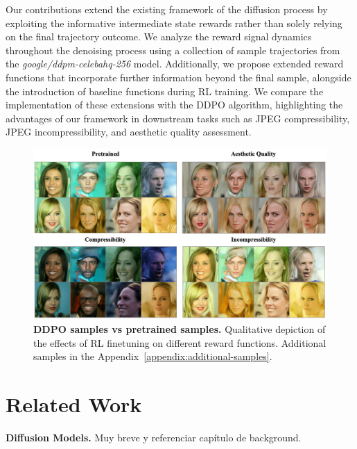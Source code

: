 Our contributions extend the existing framework of the diffusion process by exploiting the informative intermediate state rewards rather than solely relying on the final trajectory outcome. We analyze the reward signal dynamics throughout the denoising process using a collection of sample trajectories from the \textit{google/ddpm-celebahq-256} model. Additionally, we propose extended reward functions that incorporate further information beyond the final sample, alongside the introduction of baseline functions during RL training. We compare the implementation of these extensions with the DDPO algorithm, highlighting the advantages of our framework in downstream tasks such as JPEG compressibility, JPEG incompressibility, and aesthetic quality assessment.

\begin{figure}[ht]
  \centering
  \includegraphics[scale=0.72]{img/results/visual-comparison-results-200dpi.png}
  \vspace{-4pt}  %
    \captionsetup{width=\textwidth} %
    \caption{\textbf{DDPO samples vs pretrained samples.} Qualitative depiction of the effects of RL finetuning on different reward functions. Additional
    samples in the Appendix~\ref{appendix:additional-samples}.}
    \label{fig:visual-comparison-ddpo}
\end{figure}

\section{Related Work}

\textbf{Diffusion Models.} Muy breve y referenciar capítulo de background.\\

